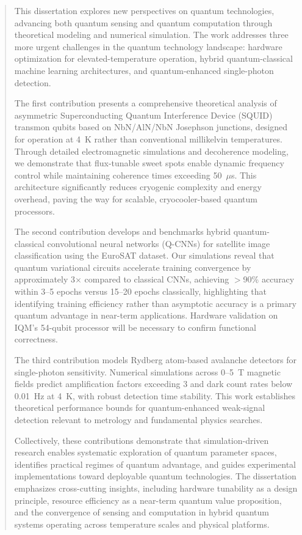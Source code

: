 \begin{abstract}
This dissertation explores new perspectives on quantum technologies, advancing both quantum sensing and quantum computation through theoretical modeling and numerical simulation. The work addresses three more urgent challenges in the quantum technology landscape: hardware optimization for elevated-temperature operation, hybrid quantum-classical machine learning architectures, and quantum-enhanced single-photon detection.

The first contribution presents a comprehensive theoretical analysis of asymmetric Superconducting Quantum Interference Device (SQUID) transmon qubits based on NbN/AlN/NbN Josephson junctions, designed for operation at 4~K rather than conventional millikelvin temperatures. Through detailed electromagnetic simulations and decoherence modeling, we demonstrate that flux-tunable sweet spots enable dynamic frequency control while maintaining coherence times exceeding 50~$\mu$s. This architecture significantly reduces cryogenic complexity and energy overhead, paving the way for scalable, cryocooler-based quantum processors.

The second contribution develops and benchmarks hybrid quantum-classical convolutional neural networks (Q-CNNs) for satellite image classification using the EuroSAT dataset. Our simulations reveal that quantum variational circuits accelerate training convergence by approximately 3$\times$ compared to classical CNNs, achieving $>$90\% accuracy within 3--5 epochs versus 15--20 epochs classically, highlighting that identifying training efficiency rather than asymptotic accuracy is a primary quantum advantage in near-term applications. Hardware validation on IQM's 54-qubit processor will be necessary to confirm functional correctness.

The third contribution models Rydberg atom-based avalanche detectors for single-photon sensitivity. Numerical simulations across 0--5~T magnetic fields predict amplification factors exceeding 3 and dark count rates below 0.01~Hz at 4~K, with robust detection time stability. This work establishes theoretical performance bounds for quantum-enhanced weak-signal detection relevant to metrology and fundamental physics searches.

Collectively, these contributions demonstrate that simulation-driven research enables systematic exploration of quantum parameter spaces, identifies practical regimes of quantum advantage, and guides experimental implementations toward deployable quantum technologies. The dissertation emphasizes cross-cutting insights, including hardware tunability as a design principle, resource efficiency as a near-term quantum value proposition, and the convergence of sensing and computation in hybrid quantum systems operating across temperature scales and physical platforms.
\end{abstract}